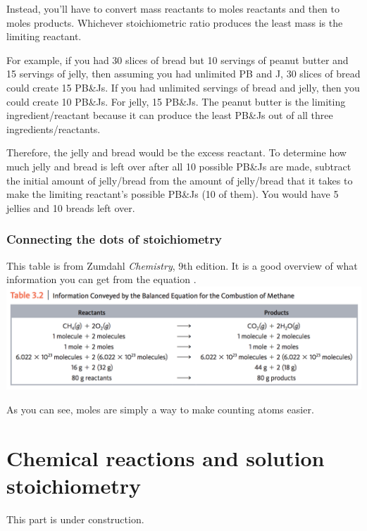 \documentclass[letterpaper, 12pt]{article}
\begin{document}
Instead, you'll have to convert mass reactants to moles reactants and then to moles products. Whichever stoichiometric ratio produces the least mass is the limiting reactant.

For example, if you had 30 slices of bread but 10 servings of peanut butter and 15 servings of jelly, then assuming you had unlimited PB and J, 30 slices of bread could create 15 PB\&Js. If you had unlimited servings of bread and jelly, then you could create 10 PB\&Js. For jelly, 15 PB\&Js. The peanut butter is the limiting ingredient/reactant because it can produce the least PB\&Js out of all three ingredients/reactants.

Therefore, the jelly and bread would be the excess reactant. To determine how much jelly and bread is left over after all 10 possible PB\&Js are made, subtract the initial amount of jelly/bread from the amount of jelly/bread that it takes to make the limiting reactant's possible PB\&Js (10 of them). You would have 5 jellies and 10 breads left over.

\section{Connecting the dots of stoichiometry}
This table is from Zumdahl \textit{Chemistry}, 9th edition. It is a good overview of what information you can get from the equation .\\

\includegraphics[width=16cm]{assets/Zumdahl_Table3-2}

As you can see, moles are simply a way to make counting atoms easier.

\clearpage

\part{Chemical reactions and solution stoichiometry}
This part is under construction.

\end{document}
